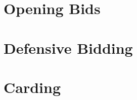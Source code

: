 \documentclass[ebook,10pt,oneside]{memoir}
\begin{document}
\frontmatter
\tableofcontents

\mainmatter


\part{Opening Bids}













\part{Defensive Bidding}
\part{Carding}
\backmatter
\end{document}
